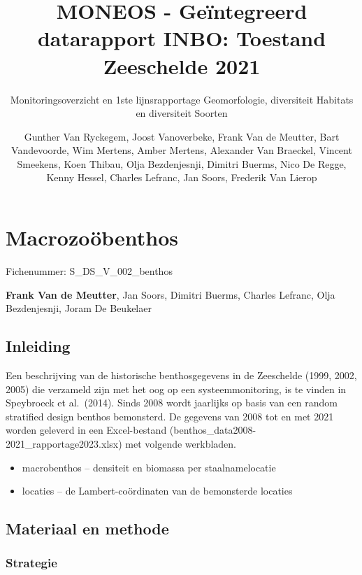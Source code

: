 \documentclass[twoside]{extreport}
\title{MONEOS - Geïntegreerd datarapport INBO: Toestand Zeeschelde 2021}
\subtitle{Monitoringsoverzicht en 1ste lijnsrapportage Geomorfologie,
diversiteit Habitats en diversiteit Soorten}
\author{
Gunther Van Ryckegem, Joost Vanoverbeke, Frank Van de Meutter, Bart
Vandevoorde, Wim Mertens, Amber Mertens, Alexander Van Braeckel, Vincent
Smeekens, Koen Thibau, Olja Bezdenjesnji, Dimitri Buerms, Nico De
Regge, Kenny Hessel, Charles Lefranc, Jan Soors, Frederik Van Lierop
}
\begin{document}
\maketitle
{}



\clearpage

{}
\setcounter{tocdepth}{0}
\tableofcontents

  


\clearpage


\hypertarget{macrozouxf6benthos}{%
\chapter{Macrozoöbenthos}\label{macrozouxf6benthos}}

Fichenummer: S\_DS\_V\_002\_benthos

\textbf{Frank Van de Meutter}, Jan Soors, Dimitri Buerms, Charles
Lefranc, Olja Bezdenjesnji, Joram De Beukelaer

\hypertarget{inleiding}{%
\section{Inleiding}\label{inleiding}}

Een beschrijving van de historische benthosgegevens in de Zeeschelde
(1999, 2002, 2005) die verzameld zijn met het oog op een
systeemmonitoring, is te vinden in Speybroeck et al.~(2014). Sinds 2008
wordt jaarlijks op basis van een random stratified design benthos
bemonsterd. De gegevens van 2008 tot en met 2021 worden geleverd in een
Excel-bestand (benthos\_data2008-2021\_rapportage2023.xlsx) met volgende
werkbladen.

\begin{itemize}
\tightlist
\item
  macrobenthos -- densiteit en biomassa per staalnamelocatie
\item
  locaties -- de Lambert-coördinaten van de bemonsterde locaties
\end{itemize}

\hypertarget{materiaal-en-methode}{%
\section{Materiaal en methode}\label{materiaal-en-methode}}

\hypertarget{strategie}{%
\subsection{Strategie}\label{strategie}}
\end{document}
